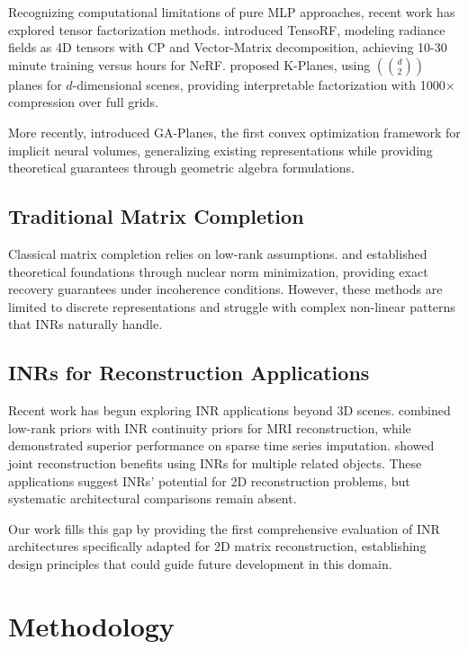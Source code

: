 \documentclass{article}
\begin{document}
Recognizing computational limitations of pure MLP approaches, recent work has explored tensor factorization methods. \cite{chen2022tensorf} introduced TensoRF, modeling radiance fields as 4D tensors with CP and Vector-Matrix decomposition, achieving 10-30 minute training versus hours for NeRF. \cite{fridovich2023kplanes} proposed K-Planes, using $(d \choose 2)$ planes for $d$-dimensional scenes, providing interpretable factorization with 1000× compression over full grids.

More recently, \cite{sivgin2024gaplanes} introduced GA-Planes, the first convex optimization framework for implicit neural volumes, generalizing existing representations while providing theoretical guarantees through geometric algebra formulations.

\subsection{Traditional Matrix Completion}

Classical matrix completion relies on low-rank assumptions. \cite{candes2009matrix} and \cite{recht2011simpler} established theoretical foundations through nuclear norm minimization, providing exact recovery guarantees under incoherence conditions. However, these methods are limited to discrete representations and struggle with complex non-linear patterns that INRs naturally handle.

\subsection{INRs for Reconstruction Applications}

Recent work has begun exploring INR applications beyond 3D scenes. \cite{zhang2025lorein} combined low-rank priors with INR continuity priors for MRI reconstruction, while \cite{li2025imputeinr} demonstrated superior performance on sparse time series imputation. \cite{shi2024inr} showed joint reconstruction benefits using INRs for multiple related objects. These applications suggest INRs' potential for 2D reconstruction problems, but systematic architectural comparisons remain absent.

Our work fills this gap by providing the first comprehensive evaluation of INR architectures specifically adapted for 2D matrix reconstruction, establishing design principles that could guide future development in this domain.

\section{Methodology}
\end{document}
